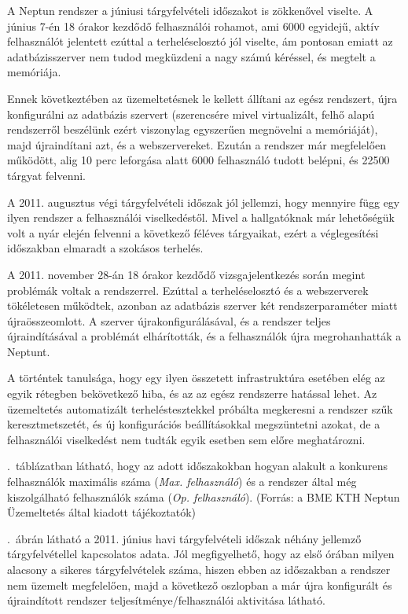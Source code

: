 A Neptun rendszer a júniusi tárgyfelvételi időszakot is zökkenővel viselte.\cite{neptun3} A június 7-én 18 órakor kezdődő felhasználói rohamot, ami 6000 egyidejű, aktív felhasználót jelentett ezúttal a terheléselosztó jól viselte, ám pontosan emiatt az adatbázisszerver nem tudod megküzdeni a nagy számú kéréssel, és megtelt a memóriája.

Ennek következtében az üzemeltetésnek le kellett állítani az egész rendszert, újra konfigurálni az adatbázis szervert (szerencsére mivel virtualizált, felhő alapú rendszerről beszélünk\cite{neptun1} ezért viszonylag egyszerűen megnövelni a memóriáját), majd újraindítani azt, és a webszervereket. Ezután a rendszer már megfelelően működött, alig 10 perc leforgása alatt 6000 felhasználó tudott belépni, és 22500 tárgyat felvenni.

A 2011. augusztus végi tárgyfelvételi időszak jól jellemzi, hogy mennyire függ egy ilyen rendszer a felhasználói viselkedéstől. \cite{neptun4} Mivel a hallgatóknak már lehetőségük volt a nyár elején felvenni a következő féléves tárgyaikat, ezért a véglegesítési időszakban elmaradt a szokásos terhelés.

A 2011. november 28-án 18 órakor kezdődő vizsgajelentkezés során megint problémák voltak a rendszerrel.\cite{neptun5} Ezúttal a terheléselosztó és a webszerverek tökéletesen működtek, azonban az adatbázis szerver két rendszerparaméter miatt újraösszeomlott. A szerver újrakonfigurálásával, és a rendszer teljes újraindításával a problémát elhárították, és a felhasználók újra megrohanhatták a Neptunt.

A történtek tanulsága, hogy egy ilyen összetett infrastruktúra esetében elég az egyik rétegben bekövetkező hiba, és az az egész rendszerre hatással lehet. Az üzemeltetés automatizált terheléstesztekkel próbálta megkeresni a rendszer szűk keresztmetszetét, és új konfigurációs beállításokkal megszüntetni azokat, de a felhasználói viselkedést nem tudták egyik esetben sem előre meghatározni.

.~táblázatban látható, hogy az adott időszakokban hogyan alakult a konkurens felhasználók maximális száma (\textit{Max. felhasználó}) és a rendszer által még kiszolgálható felhasználók száma (\textit{Op. felhasználó}). (Forrás: a BME KTH Neptun Üzemeltetés által kiadott tájékoztatók)



.~ábrán látható a 2011. június havi tárgyfelvételi időszak néhány jellemző tárgyfelvétellel kapcsolatos adata. Jól megfigyelhető, hogy az első órában milyen alacsony a sikeres tárgyfelvételek száma, hiszen ebben az időszakban a rendszer nem üzemelt megfelelően, majd a következő oszlopban a már újra konfigurált és újraindított rendszer teljesítménye/felhasználói aktivitása látható.

